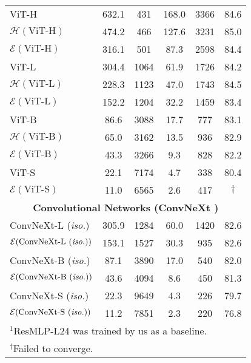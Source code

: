 \begin{table}[t]
{\begin{tabular}{@{ }l@{}c@{ }c@{ }c@{ }c|c@{\ }}
    ViT-H & 632.1  & 431 & 168.0 & 3366 & 84.6  \\
    $\mathcal{H}(\text{ViT-H})$ & 474.2  & 466 & 127.6 & 3231 & 85.0  \\
    $\mathcal{E}(\text{ViT-H})$ & 316.1  & 501 & 87.3 & 2598 & 84.4  \\
    ViT-L & 304.4  & 1064 & 61.9 & 1726 & 84.2  \\
    $\mathcal{H}(\text{ViT-L})$ & 228.3  & 1123 & 47.0 & 1743 & 84.5  \\
    $\mathcal{E}(\text{ViT-L})$ & 152.2  & 1204 & 32.2 & 1459 & 83.4  \\
    ViT-B & 86.6  & 3088 & 17.7 & 777 & 83.1  \\
    $\mathcal{H}(\text{ViT-B})$ & 65.0  & 3162 & 13.5 & 936 & 82.9  \\
    $\mathcal{E}(\text{ViT-B})$ & 43.3  & 3266 & 9.3 & 828 & 82.2  \\
    ViT-S & 22.1  & 7174 & 4.7 & 338 & 80.4  \\
    $\mathcal{E}(\text{ViT-S})$ & 11.0  & 6565 & 2.6 & 417 & $\dagger$  \\
    
    \toprule
    \multicolumn{6}{c}{\textbf{Convolutional Networks (ConvNeXt \cite{liu2022convnext})}} \\ [3pt]
    ConvNeXt-L (\textit{iso.}) & 305.9 & 1284 & 60.0 & 1420 & 82.6 \\
    $\mathcal{E}(\text{ConvNeXt-L (\textit{iso.})})$ & 153.1 & 1527 & 30.3 & 935 & 82.6 \\
    ConvNeXt-B (\textit{iso.}) & 87.1 & 3890 & 17.0 & 540 & 82.0 \\
    $\mathcal{E}(\text{ConvNeXt-B (\textit{iso.})})$ & 43.6 & 4094 & 8.6 & 450 & 81.3 \\
    ConvNeXt-S (\textit{iso.}) & 22.3 & 9649 & 4.3 & 226 & 79.7 \\
    $\mathcal{E}(\text{ConvNeXt-S (\textit{iso.})})$ & 11.2 & 7851 & 2.3 & 220 & 76.8 \\
    \bottomrule
    \multicolumn{6}{l}{\footnotesize $^1$ResMLP-L24 was trained by us as a baseline.} \\
    \multicolumn{6}{l}{\footnotesize $^\dagger$Failed to converge.} \\
    \end{tabular}}
\end{table}

    
